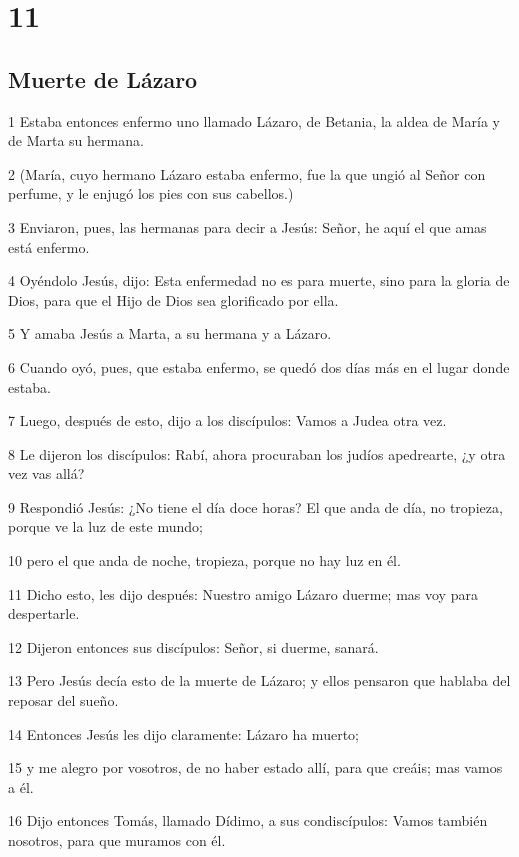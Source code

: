 \chapter{11}

\section*{Muerte de Lázaro}

\par 1 Estaba entonces enfermo uno llamado Lázaro, de Betania, la aldea de María y de Marta su hermana.
\par 2 (María, cuyo hermano Lázaro estaba enfermo, fue la que ungió al Señor con perfume, y le enjugó los pies con sus cabellos.)
\par 3 Enviaron, pues, las hermanas para decir a Jesús: Señor, he aquí el que amas está enfermo.
\par 4 Oyéndolo Jesús, dijo: Esta enfermedad no es para muerte, sino para la gloria de Dios, para que el Hijo de Dios sea glorificado por ella.
\par 5 Y amaba Jesús a Marta, a su hermana y a Lázaro.
\par 6 Cuando oyó, pues, que estaba enfermo, se quedó dos días más en el lugar donde estaba.
\par 7 Luego, después de esto, dijo a los discípulos: Vamos a Judea otra vez.
\par 8 Le dijeron los discípulos: Rabí, ahora procuraban los judíos apedrearte, ¿y otra vez vas allá?
\par 9 Respondió Jesús: ¿No tiene el día doce horas? El que anda de día, no tropieza, porque ve la luz de este mundo;
\par 10 pero el que anda de noche, tropieza, porque no hay luz en él.
\par 11 Dicho esto, les dijo después: Nuestro amigo Lázaro duerme; mas voy para despertarle.
\par 12 Dijeron entonces sus discípulos: Señor, si duerme, sanará.
\par 13 Pero Jesús decía esto de la muerte de Lázaro; y ellos pensaron que hablaba del reposar del sueño.
\par 14 Entonces Jesús les dijo claramente: Lázaro ha muerto;
\par 15 y me alegro por vosotros, de no haber estado allí, para que creáis; mas vamos a él.
\par 16 Dijo entonces Tomás, llamado Dídimo, a sus condiscípulos: Vamos también nosotros, para que muramos con él.

